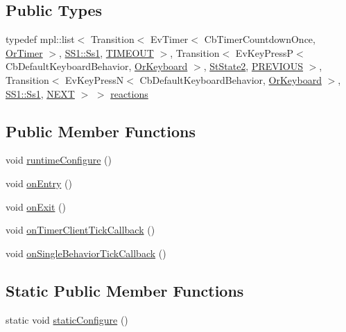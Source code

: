 \subsection*{Public Types}
\begin{DoxyCompactItemize}
\item 
typedef mpl\+::list$<$ Transition$<$ Ev\+Timer$<$ Cb\+Timer\+Countdown\+Once, \hyperlink{classsm__three__some_1_1OrTimer}{Or\+Timer} $>$, \hyperlink{structsm__three__some_1_1SS1_1_1Ss1}{S\+S1\+::\+Ss1}, \hyperlink{structsm__three__some_1_1StState3_1_1TIMEOUT}{T\+I\+M\+E\+O\+UT} $>$, Transition$<$ Ev\+Key\+PressP$<$ Cb\+Default\+Keyboard\+Behavior, \hyperlink{classsm__three__some_1_1OrKeyboard}{Or\+Keyboard} $>$, \hyperlink{structsm__three__some_1_1StState2}{St\+State2}, \hyperlink{structsm__three__some_1_1StState3_1_1PREVIOUS}{P\+R\+E\+V\+I\+O\+US} $>$, Transition$<$ Ev\+Key\+PressN$<$ Cb\+Default\+Keyboard\+Behavior, \hyperlink{classsm__three__some_1_1OrKeyboard}{Or\+Keyboard} $>$, \hyperlink{structsm__three__some_1_1SS1_1_1Ss1}{S\+S1\+::\+Ss1}, \hyperlink{structsm__three__some_1_1StState3_1_1NEXT}{N\+E\+XT} $>$ $>$ \hyperlink{structsm__three__some_1_1StState3_a89f031caa695f9b5e19316bfb533298b}{reactions}
\end{DoxyCompactItemize}
\subsection*{Public Member Functions}
\begin{DoxyCompactItemize}
\item 
void \hyperlink{structsm__three__some_1_1StState3_a0bbc5d978988e68ef9b50b78aa07f884}{runtime\+Configure} ()
\item 
void \hyperlink{structsm__three__some_1_1StState3_a96517119b4657e683517f132a7a9f57b}{on\+Entry} ()
\item 
void \hyperlink{structsm__three__some_1_1StState3_a524c4f977503359c992aaebeb9bf2689}{on\+Exit} ()
\item 
void \hyperlink{structsm__three__some_1_1StState3_ad0824fed4473635b576f5e5caef9e155}{on\+Timer\+Client\+Tick\+Callback} ()
\item 
void \hyperlink{structsm__three__some_1_1StState3_ad3223b538c8f4efbd1e21e2d51c18926}{on\+Single\+Behavior\+Tick\+Callback} ()
\end{DoxyCompactItemize}
\subsection*{Static Public Member Functions}
\begin{DoxyCompactItemize}
\item 
static void \hyperlink{structsm__three__some_1_1StState3_ada7e90f8207dd295b4db425e0c13f4ab}{static\+Configure} ()
\end{DoxyCompactItemize}
